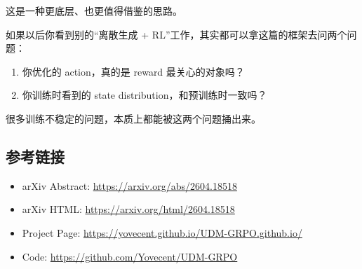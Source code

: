 这是一种更底层、也更值得借鉴的思路。

如果以后你看到别的“离散生成 + RL”工作，其实都可以拿这篇的框架去问两个问题：

\begin{enumerate}[leftmargin=1.5em]
  \item 你优化的 action，真的是 reward 最关心的对象吗？
  \item 你训练时看到的 state distribution，和预训练时一致吗？
\end{enumerate}

很多训练不稳定的问题，本质上都能被这两个问题捅出来。

\subsection{参考链接}

\begin{itemize}[leftmargin=1.5em]
  \item arXiv Abstract: \url{https://arxiv.org/abs/2604.18518}
  \item arXiv HTML: \url{https://arxiv.org/html/2604.18518}
  \item Project Page: \url{https://yovecent.github.io/UDM-GRPO.github.io/}
  \item Code: \url{https://github.com/Yovecent/UDM-GRPO}
\end{itemize}
